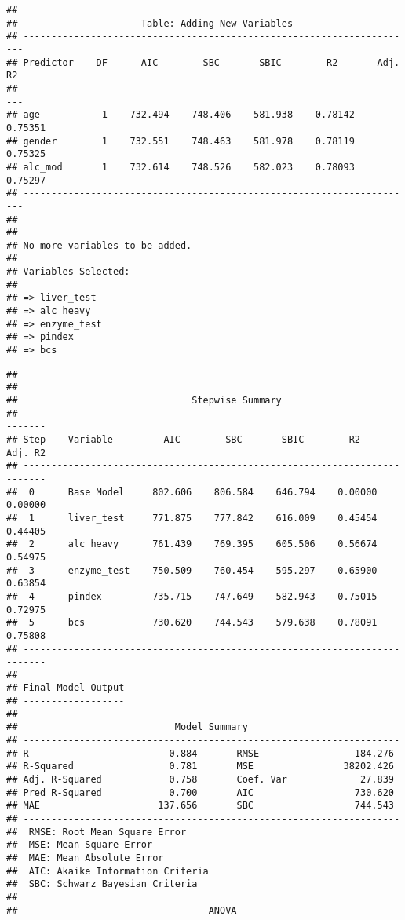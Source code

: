 \documentclass[
]{article}
\begin{document}
\begin{verbatim}
## 
##                      Table: Adding New Variables                       
## ----------------------------------------------------------------------
## Predictor    DF      AIC        SBC       SBIC        R2       Adj. R2 
## ----------------------------------------------------------------------
## age           1    732.494    748.406    581.938    0.78142    0.75351 
## gender        1    732.551    748.463    581.978    0.78119    0.75325 
## alc_mod       1    732.614    748.526    582.023    0.78093    0.75297 
## ----------------------------------------------------------------------
## 
## 
## No more variables to be added.
## 
## Variables Selected: 
## 
## => liver_test 
## => alc_heavy 
## => enzyme_test 
## => pindex 
## => bcs
\end{verbatim}

\begin{verbatim}
## 
## 
##                               Stepwise Summary                              
## --------------------------------------------------------------------------
## Step    Variable         AIC        SBC       SBIC        R2       Adj. R2 
## --------------------------------------------------------------------------
##  0      Base Model     802.606    806.584    646.794    0.00000    0.00000 
##  1      liver_test     771.875    777.842    616.009    0.45454    0.44405 
##  2      alc_heavy      761.439    769.395    605.506    0.56674    0.54975 
##  3      enzyme_test    750.509    760.454    595.297    0.65900    0.63854 
##  4      pindex         735.715    747.649    582.943    0.75015    0.72975 
##  5      bcs            730.620    744.543    579.638    0.78091    0.75808 
## --------------------------------------------------------------------------
## 
## Final Model Output 
## ------------------
## 
##                            Model Summary                            
## -------------------------------------------------------------------
## R                         0.884       RMSE                 184.276 
## R-Squared                 0.781       MSE                38202.426 
## Adj. R-Squared            0.758       Coef. Var             27.839 
## Pred R-Squared            0.700       AIC                  730.620 
## MAE                     137.656       SBC                  744.543 
## -------------------------------------------------------------------
##  RMSE: Root Mean Square Error 
##  MSE: Mean Square Error 
##  MAE: Mean Absolute Error 
##  AIC: Akaike Information Criteria 
##  SBC: Schwarz Bayesian Criteria 
## 
##                                  ANOVA                                  

\end{verbatim}
\end{document}
